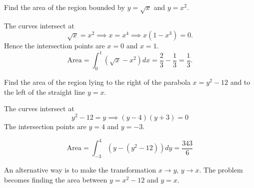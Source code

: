 \documentclass[../calc1-main.tex]{subfiles}
\begin{document}
\begin{example}
	Find the area of the region bounded by $y=\sqrt{x}$ and $y=x^2$.
\end{example}
\begin{minipage}{0.5\textwidth}
  \begin{solution}
  	The curves intersect at
  	\[
  		\sqrt{x} = x^2 \implies x = x^4 \implies x(1-x^3) = 0.
  	\]
  	Hence the intersection points are $x=0$ and $x=1$.
  	\[
  		\text{Area} = \int_0^1 \left( \sqrt{x} - x^2 \right) dx = \frac{2}{3} - \frac{1}{3} = \frac{1}{3}.
  	\]
  \end{solution}
\end{minipage}%
\begin{minipage}{0.5\textwidth}
  \begin{figure}[H]
    	\centering
    	
   \end{figure}
\end{minipage}

\begin{example}
	Find the area of the region lying to the right of the parabola $x=y^2-12$ and to the left of the straight line $y=x$.
\end{example}
\begin{minipage}{0.5\textwidth}
  \begin{solution}
  	The curves intersect at
  	\[
  		y^2 - 12 = y \implies (y-4)(y+3) = 0
  	\]
  	The intersection points are $y=4$ and $y=-3$.

  	\[
  		\text{Area} = \int_{-3}^4 \left( y - (y^2-12)  \right) dy = \frac{343}{6}
  	\]

  	An alternative way is to make the transformation $x \to y$, $y \to x$. The problem becomes finding the area between $y=x^2-12$ and $y=x$.
  \end{solution}
\end{minipage}%
\begin{minipage}{0.5\textwidth}
  \begin{figure}[H]
    	\centering
    	
   \end{figure}
\end{minipage}
\end{document}
